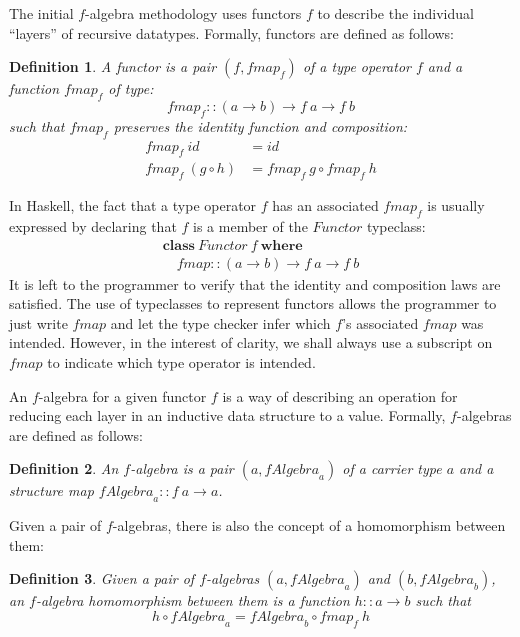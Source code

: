 \documentclass{jfp1}
\newtheorem{definition}{Definition}
\newcommand{\kw}[1]{\textbf{#1}}
\begin{document}
The initial $f$-algebra methodology uses functors $f$ to describe the
individual ``layers'' of recursive datatypes.
Formally, functors are defined as follows:
\begin{definition}\label{defn:functor}
  A \emph{functor} is a pair $(f, \mathit{fmap}_f)$ of a type operator
  $f$ and a function $\mathit{fmap}_f$ of type:
  \begin{displaymath}
    \mathit{fmap}_f :: (a \to b) \to f~a \to f~b
  \end{displaymath}
  such that $\mathit{fmap}_f$ preserves the identity function and
  composition:
  \begin{align}
    \label{eq:fmap-id}
    \mathit{fmap}_f~\mathit{id} & = \mathit{id} \\
    \label{eq:fmap-comp}
    \mathit{fmap}_f~(g \circ h) & = \mathit{fmap}_f~g \circ \mathit{fmap}_f~h
  \end{align}
\end{definition}

In Haskell, the fact that a type operator $f$ has an associated
$\mathit{fmap}_f$ is usually expressed by declaring that $f$ is a
member of the $\mathit{Functor}$ typeclass:
\begin{displaymath}
  \begin{array}{l}
    \kw{class}~\mathit{Functor}~f~\kw{where} \\
    \quad \mathit{fmap} :: (a \to b) \to f~a \to f~b
  \end{array}
\end{displaymath}
It is left to the programmer to verify that the identity and
composition laws are satisfied.
The use of typeclasses to represent functors allows
the programmer to just write $\mathit{fmap}$ and let the type checker
infer which $f$'s associated $\mathit{fmap}$ was intended. However, in
the interest of clarity, we shall always use a subscript on
$\mathit{fmap}$ to indicate which type operator is intended.

An $f$-algebra for a given functor $f$ is a way of describing an
operation for reducing each layer in an inductive data structure to a
value. Formally, $f$-algebras are defined as follows:
\begin{definition}
  An \emph{$f$-algebra} is a pair $(a, \mathit{fAlgebra}_a)$ of a
  \emph{carrier type} $a$ and a \emph{structure map}
  $\mathit{fAlgebra}_a :: f~a \to a$.
\end{definition}
Given a pair of $f$-algebras, there is also the concept of a
homomorphism between them:
\begin{definition}
  Given a pair of $f$-algebras $(a,\mathit{fAlgebra}_a)$ and $(b,
  \mathit{fAlgebra}_b)$, an \emph{$f$-algebra homomorphism} between them is a
  function $h :: a \to b$ such that
  \begin{equation}
    \label{eq:falgebra-homomorphism}
    h \circ \mathit{fAlgebra}_a = \mathit{fAlgebra}_b \circ \mathit{fmap}_f~h
  \end{equation}
\end{definition}
\end{document}
